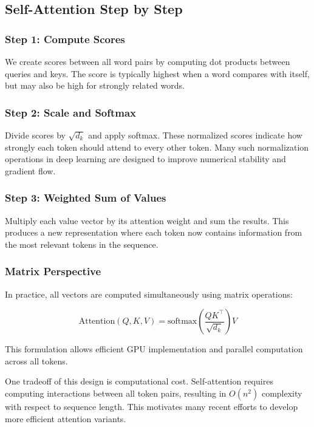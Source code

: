 \documentclass[11pt]{article}
\begin{document}
\subsection{Self-Attention Step by Step}

\subsubsection{Step 1: Compute Scores}

We create scores between all word pairs by computing dot products between queries and keys. The score is typically highest when a word compares with itself, but may also be high for strongly related words.

\subsubsection{Step 2: Scale and Softmax}

Divide scores by $\sqrt{d_k}$ and apply softmax. These normalized scores indicate how strongly each token should attend to every other token. Many such normalization operations in deep learning are designed to improve numerical stability and gradient flow.

\subsubsection{Step 3: Weighted Sum of Values}

Multiply each value vector by its attention weight and sum the results. This produces a new representation where each token now contains information from the most relevant tokens in the sequence.

\subsubsection{Matrix Perspective}

In practice, all vectors are computed simultaneously using matrix operations:

\[
\text{Attention}(Q,K,V)
=
\text{softmax}
\left(
\frac{QK^\top}{\sqrt{d_k}}
\right)V
\]

This formulation allows efficient GPU implementation and parallel computation across all tokens.

One tradeoff of this design is computational cost. Self-attention requires computing interactions between all token pairs, resulting in $O(n^2)$ complexity with respect to sequence length. This motivates many recent efforts to develop more efficient attention variants.
\end{document}
